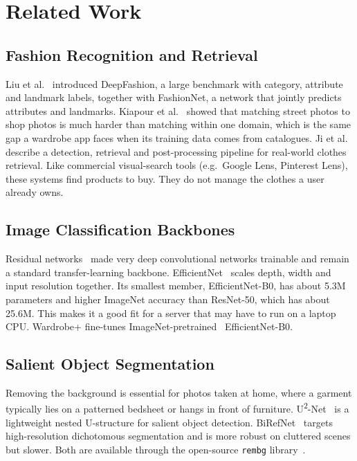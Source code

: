 \documentclass[conference]{IEEEtran}
\begin{document}
\section{Related Work}
\subsection{Fashion Recognition and Retrieval}
Liu et al.~\cite{liu2016deepfashion} introduced DeepFashion, a large benchmark with category, attribute and landmark labels, together with FashionNet, a network that jointly predicts attributes and landmarks. Kiapour et al.~\cite{kiapour2015street2shop} showed that matching street photos to shop photos is much harder than matching within one domain, which is the same gap a wardrobe app faces when its training data comes from catalogues. Ji et al.~\cite{ji2020pipeline} describe a detection, retrieval and post-processing pipeline for real-world clothes retrieval. Like commercial visual-search tools (e.g.\ Google Lens, Pinterest Lens), these systems find products to buy. They do not manage the clothes a user already owns.

\subsection{Image Classification Backbones}
Residual networks~\cite{he2016resnet} made very deep convolutional networks trainable and remain a standard transfer-learning backbone. EfficientNet~\cite{tan2019efficientnet} scales depth, width and input resolution together. Its smallest member, EfficientNet-B0, has about 5.3M parameters and higher ImageNet accuracy than ResNet-50, which has about 25.6M. This makes it a good fit for a server that may have to run on a laptop CPU. Wardrobe+ fine-tunes ImageNet-pretrained~\cite{deng2009imagenet} EfficientNet-B0.

\subsection{Salient Object Segmentation}
Removing the background is essential for photos taken at home, where a garment typically lies on a patterned bedsheet or hangs in front of furniture. U\textsuperscript{2}-Net~\cite{qin2020u2net} is a lightweight nested U-structure for salient object detection. BiRefNet~\cite{zheng2024birefnet} targets high-resolution dichotomous segmentation and is more robust on cluttered scenes but slower. Both are available through the open-source \texttt{rembg} library~\cite{rembg}.
\end{document}
